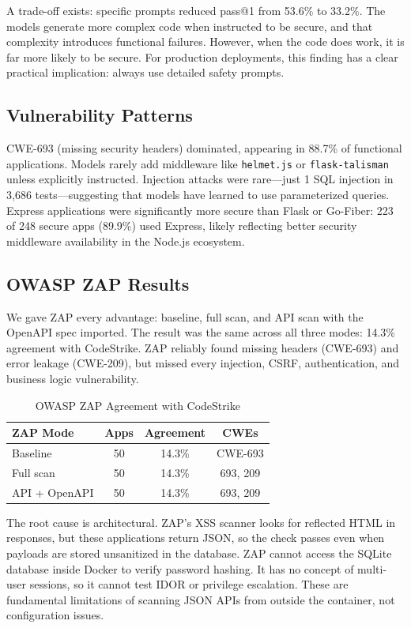 \documentclass[conference,a4paper]{IEEEtran}
\begin{document}
A trade-off exists: specific prompts reduced pass@1 from 53.6\% to 33.2\%. The models generate more complex code when instructed to be secure, and that complexity introduces functional failures. However, when the code does work, it is far more likely to be secure. For production deployments, this finding has a clear practical implication: always use detailed safety prompts.

\subsection{Vulnerability Patterns}

CWE-693 (missing security headers) dominated, appearing in 88.7\% of functional applications. Models rarely add middleware like \texttt{helmet.js} or \texttt{flask-talisman} unless explicitly instructed. Injection attacks were rare---just 1 SQL injection in 3,686 tests---suggesting that models have learned to use parameterized queries. Express applications were significantly more secure than Flask or Go-Fiber: 223 of 248 secure apps (89.9\%) used Express, likely reflecting better security middleware availability in the Node.js ecosystem.

\subsection{OWASP ZAP Results}

We gave ZAP every advantage: baseline, full scan, and API scan with the OpenAPI spec imported. The result was the same across all three modes: 14.3\% agreement with CodeStrike. ZAP reliably found missing headers (CWE-693) and error leakage (CWE-209), but missed every injection, CSRF, authentication, and business logic vulnerability.

\begin{table}[htbp]
\caption{OWASP ZAP Agreement with CodeStrike}
\label{tab:zap}
\centering
\begin{tabular}{lccc}
\toprule
\textbf{ZAP Mode} & \textbf{Apps} & \textbf{Agreement} & \textbf{CWEs} \\
\midrule
Baseline & 50 & 14.3\% & CWE-693 \\
Full scan & 50 & 14.3\% & 693, 209 \\
API + OpenAPI & 50 & 14.3\% & 693, 209 \\
\bottomrule
\end{tabular}
\end{table}

The root cause is architectural. ZAP's XSS scanner looks for reflected HTML in responses, but these applications return JSON, so the check passes even when payloads are stored unsanitized in the database. ZAP cannot access the SQLite database inside Docker to verify password hashing. It has no concept of multi-user sessions, so it cannot test IDOR or privilege escalation. These are fundamental limitations of scanning JSON APIs from outside the container, not configuration issues.
\end{document}
